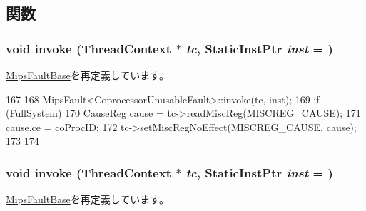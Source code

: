 \subsection{関数}
\hypertarget{classMipsISA_1_1CoprocessorUnusableFault_a2bd783b42262278d41157d428e1f8d6f}{
\subsubsection[{invoke}]{\setlength{\rightskip}{0pt plus 5cm}void invoke ({\bf ThreadContext} $\ast$ {\em tc}, \/  {\bf StaticInstPtr} {\em inst} = {})}}
\label{classMipsISA_1_1CoprocessorUnusableFault_a2bd783b42262278d41157d428e1f8d6f}


\hyperlink{classMipsISA_1_1MipsFaultBase_a2bd783b42262278d41157d428e1f8d6f}{MipsFaultBase}を再定義しています。


\begin{DoxyCode}
167     {
168         MipsFault<CoprocessorUnusableFault>::invoke(tc, inst);
169         if (FullSystem) {
170             CauseReg cause = tc->readMiscReg(MISCREG_CAUSE);
171             cause.ce = coProcID;
172             tc->setMiscRegNoEffect(MISCREG_CAUSE, cause);
173         }
174     }
\end{DoxyCode}
\hypertarget{classMipsISA_1_1CoprocessorUnusableFault_a2bd783b42262278d41157d428e1f8d6f}{
\subsubsection[{invoke}]{\setlength{\rightskip}{0pt plus 5cm}void invoke ({\bf ThreadContext} $\ast$ {\em tc}, \/  {\bf StaticInstPtr} {\em inst} = {})}}
\label{classMipsISA_1_1CoprocessorUnusableFault_a2bd783b42262278d41157d428e1f8d6f}


\hyperlink{classMipsISA_1_1MipsFaultBase_a2bd783b42262278d41157d428e1f8d6f}{MipsFaultBase}を再定義しています。


